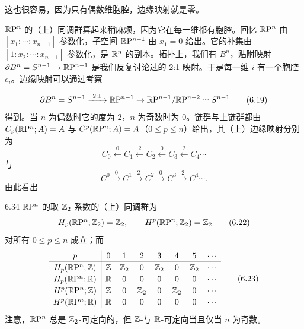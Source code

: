 这也很容易，因为只有偶数维胞腔，边缘映射就是零。

$\mathbb{R}\mathrm{P}^n$ 的（上）同调群算起来稍麻烦，因为它在每一维都有胞腔。回忆 $\mathbb{R}\mathrm{P}^n$ 由 $[x_1:\cdots:x_{n+1}]$ 参数化，子空间 $\mathbb{R}\mathrm{P}^{n-1}$ 由 $x_1=0$ 给出。它的补集由 $[1:x_2:\cdots:x_{n+1}]$ 参数化，是 $\mathbb{R}^n$ 的副本。拓扑上，我们有 $B^n$，贴附映射 $\partial B^n=S^{n-1}\to\mathbb{R}\mathrm{P}^{n-1}$ 是我们反复讨论过的 2:1 映射。于是每一维 $i$ 有一个胞腔 $e_i$。边缘映射可以通过考察

\begin{equation}
  \partial B^n=S^{n-1}\xrightarrow{\ 2:1\ }\RP^{n-1}\to\RP^{n-1}/\RP^{n-2}\simeq S^{n-1}
  \tag{6.19}
\end{equation}
得到。当 $n$ 为偶数时它的度为 2，$n$ 为奇数时为 0。链群与上链群都由 $C_p(\mathbb{R}\mathrm{P}^n;A)=A$ 与 $C^p(\mathbb{R}\mathrm{P}^n;A)=A$（$0\le p\le n$）给出，其（上）边缘映射分别为
\begin{equation}
  C_0\xleftarrow{\ 0\ }C_1\xleftarrow{\ 2\ }C_2\xleftarrow{\ 0\ }C_3\xleftarrow{\ 2\ }C_4\cdots
  \tag{6.20}
\end{equation}
与
\begin{equation}
  C^0\xrightarrow{\ 0\ }C^1\xrightarrow{\ 2\ }C^2\xrightarrow{\ 0\ }C^3\xrightarrow{\ 2\ }C^4\cdots.
  \tag{6.21}
\end{equation}
由此看出

\begin{example}{6.34}
  $\mathbb{R}\mathrm{P}^n$ 的取 $\mathbb{Z}_2$ 系数的（上）同调群为
  \begin{equation}
    H_p(\mathbb{R}\mathrm{P}^n;\mathbb{Z}_2)=\mathbb{Z}_2,\qquad H^p(\mathbb{R}\mathrm{P}^n;\mathbb{Z}_2)=\mathbb{Z}_2
    \tag{6.22}
  \end{equation}
  对所有 $0\le p\le n$ 成立；而
  \begin{equation}
    \renewcommand{\arraystretch}{1.15}
    \begin{array}{c|ccccccc}
      p & 0 & 1 & 2 & 3 & 4 & 5 & \cdots\\ \hline
      H_p(\RP^n;\Z) & \Z & \Z_2 & 0 & \Z_2 & 0 & \Z_2 & \cdots\\
      H_p(\RP^n;\R) & \R & 0 & 0 & 0 & 0 & 0 & \cdots\\
      H^p(\RP^n;\Z) & \Z & 0 & \Z_2 & 0 & \Z_2 & 0 & \cdots\\
      H^p(\RP^n;\R) & \R & 0 & 0 & 0 & 0 & 0 & \cdots
    \end{array}
    \tag{6.23}
  \end{equation}
  注意，$\mathbb{R}\mathrm{P}^n$ 总是 $\mathbb{Z}_2$-可定向的，但 $\mathbb{Z}$-与 $\mathbb{R}$-可定向当且仅当 $n$ 为奇数。
\end{example}


